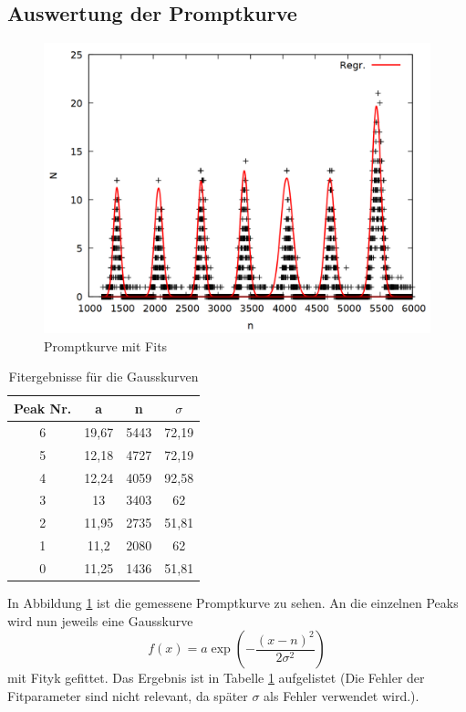 \subsection{Auswertung der Promptkurve}


\begin{figure}
\centering
\includegraphics[width=0.7\linewidth]{data/prompt2.png}
\caption{Promptkurve mit Fits}
\label{fig:prompt2}
\end{figure}

\begin{table}
\centering
\caption{Fitergebnisse für die Gausskurven}
\begin{tabular}{cccc}
\toprule
Peak Nr. & a & n & $\sigma$\\
\midrule
6&	19,67&	5443&	72,19\\
5&	12,18&	4727&	72,19\\
4&	12,24&	4059&	92,58\\
3&	13&	3403&	62\\
2&	11,95&	2735&	51,81\\
1&	11,2&	2080&	62\\
0&	11,25&	1436&	51,81\\
\bottomrule
\end{tabular}
\label{tab:prompt}
\end{table}

In Abbildung \ref{fig:prompt2} ist die gemessene Promptkurve zu sehen. An die einzelnen Peaks wird nun jeweils eine Gausskurve \[f(x) = a\exp{\left(-\frac{(x-n)^2}{2\sigma^2}\right)}\]mit Fityk gefittet. Das Ergebnis ist in Tabelle \ref{tab:prompt} aufgelistet (Die Fehler der Fitparameter sind nicht relevant, da später $\sigma$ als Fehler verwendet wird.).

